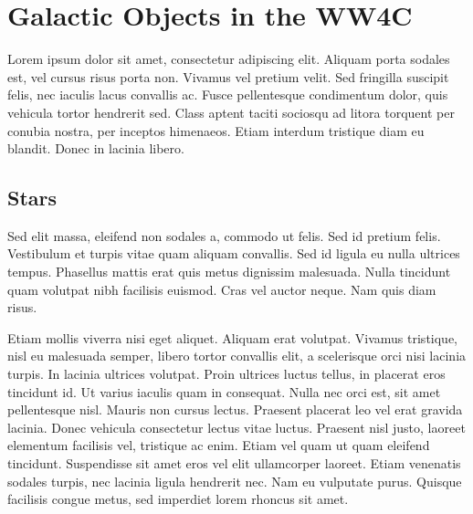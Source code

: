 \documentclass[usenatbib]{mn2e}
\begin{document}
\section{Galactic Objects in the WW4C}
Lorem ipsum dolor sit amet, consectetur adipiscing elit. Aliquam porta sodales est, vel cursus risus porta non. Vivamus vel pretium velit. Sed fringilla suscipit felis, nec iaculis lacus convallis ac. Fusce pellentesque condimentum dolor, quis vehicula tortor hendrerit sed. Class aptent taciti sociosqu ad litora torquent per conubia nostra, per inceptos himenaeos. Etiam interdum tristique diam eu blandit. Donec in lacinia libero.

\subsection{Stars}
Sed elit massa, eleifend non sodales a, commodo ut felis. Sed id pretium felis. Vestibulum et turpis vitae quam aliquam convallis. Sed id ligula eu nulla ultrices tempus. Phasellus mattis erat quis metus dignissim malesuada. Nulla tincidunt quam volutpat nibh facilisis euismod. Cras vel auctor neque. Nam quis diam risus.

Etiam mollis viverra nisi eget aliquet. Aliquam erat volutpat. Vivamus tristique, nisl eu malesuada semper, libero tortor convallis elit, a scelerisque orci nisi lacinia turpis. In lacinia ultrices volutpat. Proin ultrices luctus tellus, in placerat eros tincidunt id. Ut varius iaculis quam in consequat. Nulla nec orci est, sit amet pellentesque nisl. Mauris non cursus lectus. Praesent placerat leo vel erat gravida lacinia. Donec vehicula consectetur lectus vitae luctus. Praesent nisl justo, laoreet elementum facilisis vel, tristique ac enim. Etiam vel quam ut quam eleifend tincidunt. Suspendisse sit amet eros vel elit ullamcorper laoreet. Etiam venenatis sodales turpis, nec lacinia ligula hendrerit nec. Nam eu vulputate purus. Quisque facilisis congue metus, sed imperdiet lorem rhoncus sit amet.
\end{document}
